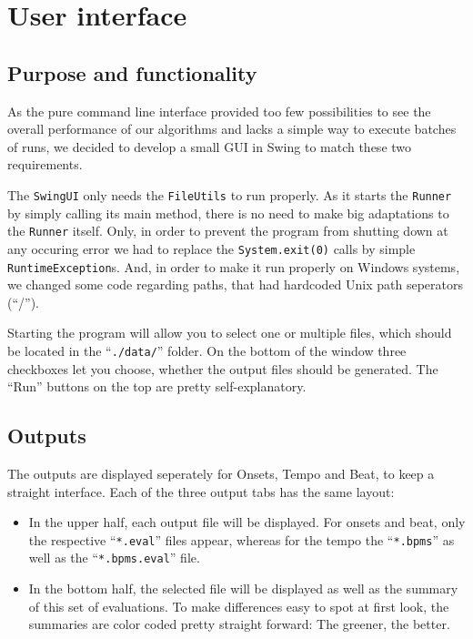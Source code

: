 \chapter{User interface} \label{cpt:gui}

\section{Purpose and functionality}
As the pure command line interface provided too few possibilities to see the
overall performance of our algorithms and lacks a simple way to execute
batches of runs, we decided to develop a small GUI in Swing to match these two
requirements.

The \texttt{SwingUI} only needs the \texttt{FileUtils} to run properly. As it
starts the \texttt{Runner} by simply calling its main method, there is no need
to make big adaptations to the \texttt{Runner} itself. Only, in order to prevent
the program from shutting down at any occuring error we had to replace the
\texttt{System.exit(0)} calls by simple \texttt{RuntimeException}s. And, in
order to make it run properly on Windows systems, we changed some code
regarding paths, that had hardcoded Unix path seperators (``/'').

Starting the program will allow you to select one or multiple files, which
should be located in the ``\texttt{./data/}'' folder. On the bottom of the
window three checkboxes let you choose, whether the output files should be
generated. The ``Run'' buttons on the top are pretty self-explanatory.

\section{Outputs}
The outputs are displayed seperately for Onsets, Tempo and Beat, to keep a
straight interface. Each of the three output tabs has the same layout:

\begin{itemize}
  \item In the upper half, each output file will be displayed. For onsets and
  beat, only the respective ``\texttt{*.eval}'' files appear, whereas for the
  tempo the ``\texttt{*.bpms}'' as well as the ``\texttt{*.bpms.eval}'' file.
  \item In the bottom half, the selected file will be displayed as well as the
  summary of this set of evaluations. To make differences easy to spot at first
  look, the summaries are color coded pretty straight forward: The greener, the
  better.
\end{itemize}

